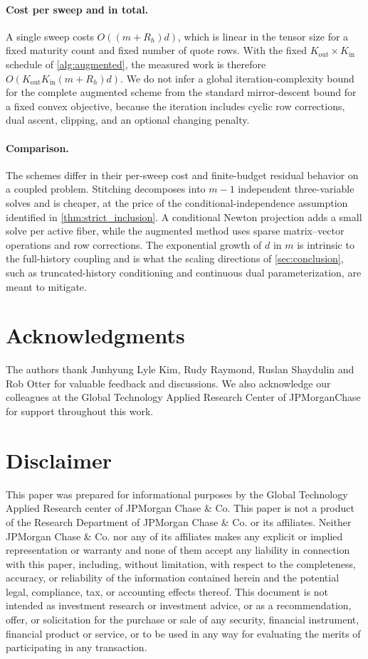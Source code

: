 \documentclass{article}
\begin{document}
\paragraph{Cost per sweep and in total.}
A single sweep costs $O((m+R_h)d)$, which is linear in the tensor size for a fixed maturity count and fixed number of quote rows.
With the fixed $K_{\mathrm{out}}\times K_{\mathrm{in}}$ schedule of \cref{alg:augmented}, the measured work is therefore
$O(K_{\mathrm{out}}K_{\mathrm{in}}(m+R_h)d)$.
We do not infer a global iteration-complexity bound for the complete augmented scheme from the standard mirror-descent bound for a fixed convex objective, because the iteration includes cyclic row corrections, dual ascent, clipping, and an optional changing penalty.

\paragraph{Comparison.} The schemes differ in their per-sweep cost and finite-budget residual behavior on a coupled problem.
Stitching decomposes into $m{-}1$ independent three-variable solves and is cheaper, at the price of the conditional-independence assumption identified in \cref{thm:strict_inclusion}.
A conditional Newton projection adds a small solve per active fiber, while the augmented method uses sparse matrix--vector operations and row corrections.
The exponential growth of $d$ in $m$ is intrinsic to the full-history coupling and is what the scaling directions of \cref{sec:conclusion}, such as truncated-history conditioning and continuous dual parameterization, are meant to mitigate.

\section*{Acknowledgments}

The authors thank Junhyung Lyle Kim, Rudy Raymond, Ruslan Shaydulin and Rob Otter for valuable feedback and discussions.
We also acknowledge our colleagues at the Global Technology Applied Research Center of JPMorganChase for support throughout this work.

\section*{Disclaimer}
This paper was prepared for informational purposes by the Global Technology Applied Research center of JPMorgan Chase \& Co. This paper is not a product of the Research Department of JPMorgan Chase \& Co. or its affiliates. Neither JPMorgan Chase \& Co. nor any of its affiliates makes any explicit or implied representation or warranty and none of them accept any liability in connection with this paper, including, without limitation, with respect to the completeness, accuracy, or reliability of the information contained herein and the potential legal, compliance, tax, or accounting effects thereof. This document is not intended as investment research or investment advice, or as a recommendation, offer, or solicitation for the purchase or sale of any security, financial instrument, financial product or service, or to be used in any way for evaluating the merits of participating in any transaction.



\end{document}
